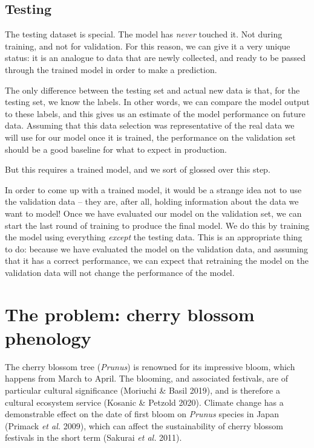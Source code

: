 \documentclass[
  letterpaper,
]{scrbook}
\begin{document}
\subsection{Testing}\label{testing}

The testing dataset is special. The model has \emph{never} touched it.
Not during training, and not for validation. For this reason, we can
give it a very unique status: it is an analogue to data that are newly
collected, and ready to be passed through the trained model in order to
make a prediction.

The only difference between the testing set and actual new data is that,
for the testing set, we know the labels. In other words, we can compare
the model output to these labels, and this gives us an estimate of the
model performance on future data. Assuming that this data selection was
representative of the real data we will use for our model once it is
trained, the performance on the validation set should be a good baseline
for what to expect in production.

But this requires a trained model, and we sort of glossed over this
step.

In order to come up with a trained model, it would be a strange idea not
to use the validation data -- they are, after all, holding information
about the data we want to model! Once we have evaluated our model on the
validation set, we can start the last round of training to produce the
final model. We do this by training the model using everything
\emph{except} the testing data. This is an appropriate thing to do:
because we have evaluated the model on the validation data, and assuming
that it has a correct performance, we can expect that retraining the
model on the validation data will not change the performance of the
model.

\section{The problem: cherry blossom
phenology}\label{the-problem-cherry-blossom-phenology}

The cherry blossom tree (\emph{Prunus}) is renowned for its impressive
bloom, which happens from March to April. The blooming, and associated
festivals, are of particular cultural significance (Moriuchi \& Basil
2019), and is therefore a cultural ecosystem service (Kosanic \& Petzold
2020). Climate change has a demonstrable effect on the date of first
bloom on \emph{Prunus} species in Japan (Primack \emph{et al.} 2009),
which can affect the sustainability of cherry blossom festivals in the
short term (Sakurai \emph{et al.} 2011).
\end{document}
